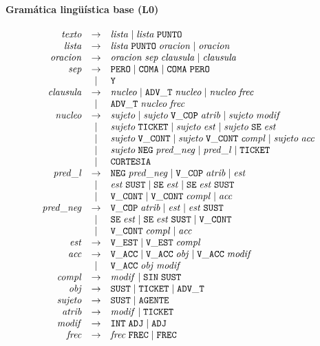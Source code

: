 \paragraph{Gramática lingüística base (L0)}
\[
\begin{array}{rcl}
  \mathit{texto} & \to & \mathit{lista} \mid \mathit{lista}\;\mathtt{PUNTO} \\
  \mathit{lista} & \to & \mathit{lista}\;\mathtt{PUNTO}\;\mathit{oracion} \mid \mathit{oracion} \\
  \mathit{oracion} & \to & \mathit{oracion}\;\mathit{sep}\;\mathit{clausula} \mid \mathit{clausula} \\
  \mathit{sep} & \to & \mathtt{PERO} \mid \mathtt{COMA} \mid \mathtt{COMA}\;\mathtt{PERO} \\
   & \mid & \mathtt{Y} \\
  \mathit{clausula} & \to & \mathit{nucleo} \mid \mathtt{ADV\_T}\;\mathit{nucleo} \mid \mathit{nucleo}\;\mathit{frec} \\
   & \mid & \mathtt{ADV\_T}\;\mathit{nucleo}\;\mathit{frec} \\
  \mathit{nucleo} & \to & \mathit{sujeto} \mid \mathit{sujeto}\;\mathtt{V\_COP}\;\mathit{atrib} \mid \mathit{sujeto}\;\mathit{modif} \\
   & \mid & \mathit{sujeto}\;\mathtt{TICKET} \mid \mathit{sujeto}\;\mathit{est} \mid \mathit{sujeto}\;\mathtt{SE}\;\mathit{est} \\
   & \mid & \mathit{sujeto}\;\mathtt{V\_CONT} \mid \mathit{sujeto}\;\mathtt{V\_CONT}\;\mathit{compl} \mid \mathit{sujeto}\;\mathit{acc} \\
   & \mid & \mathit{sujeto}\;\mathtt{NEG}\;\mathit{pred\_neg} \mid \mathit{pred\_l} \mid \mathtt{TICKET} \\
   & \mid & \mathtt{CORTESIA} \\
  \mathit{pred\_l} & \to & \mathtt{NEG}\;\mathit{pred\_neg} \mid \mathtt{V\_COP}\;\mathit{atrib} \mid \mathit{est} \\
   & \mid & \mathit{est}\;\mathtt{SUST} \mid \mathtt{SE}\;\mathit{est} \mid \mathtt{SE}\;\mathit{est}\;\mathtt{SUST} \\
   & \mid & \mathtt{V\_CONT} \mid \mathtt{V\_CONT}\;\mathit{compl} \mid \mathit{acc} \\
  \mathit{pred\_neg} & \to & \mathtt{V\_COP}\;\mathit{atrib} \mid \mathit{est} \mid \mathit{est}\;\mathtt{SUST} \\
   & \mid & \mathtt{SE}\;\mathit{est} \mid \mathtt{SE}\;\mathit{est}\;\mathtt{SUST} \mid \mathtt{V\_CONT} \\
   & \mid & \mathtt{V\_CONT}\;\mathit{compl} \mid \mathit{acc} \\
  \mathit{est} & \to & \mathtt{V\_EST} \mid \mathtt{V\_EST}\;\mathit{compl} \\
  \mathit{acc} & \to & \mathtt{V\_ACC} \mid \mathtt{V\_ACC}\;\mathit{obj} \mid \mathtt{V\_ACC}\;\mathit{modif} \\
   & \mid & \mathtt{V\_ACC}\;\mathit{obj}\;\mathit{modif} \\
  \mathit{compl} & \to & \mathit{modif} \mid \mathtt{SIN}\;\mathtt{SUST} \\
  \mathit{obj} & \to & \mathtt{SUST} \mid \mathtt{TICKET} \mid \mathtt{ADV\_T} \\
  \mathit{sujeto} & \to & \mathtt{SUST} \mid \mathtt{AGENTE} \\
  \mathit{atrib} & \to & \mathit{modif} \mid \mathtt{TICKET} \\
  \mathit{modif} & \to & \mathtt{INT}\;\mathtt{ADJ} \mid \mathtt{ADJ} \\
  \mathit{frec} & \to & \mathit{frec}\;\mathtt{FREC} \mid \mathtt{FREC} \\
\end{array}
\]

